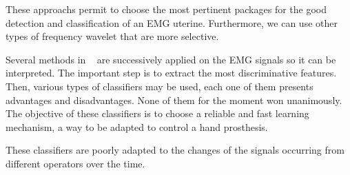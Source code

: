 \documentclass[conference]{IEEEtran}
\begin{document}
These approachs permit to choose the most pertinent packages for the good detection and classification of an EMG uterine. Furthermore, we can use other types of frequency wavelet that are more selective.\par
Several methods in ~\cite{huet} are successively applied on the EMG signals so it can be interpreted. The important step is to extract the most discriminative features. Then, various types of classifiers may be used, each one of them presents advantages and disadvantages. None of them for the moment won unanimously. The objective of these classifiers is to choose a reliable and fast learning mechanism, a way to be adapted to control a hand prosthesis.\par

These classifiers are poorly adapted to the changes of the signals occurring from different operators over the time.\par
\end{document}
